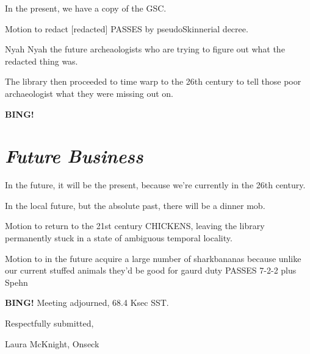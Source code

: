 \documentclass[10pt]{article}
\newcommand{\bing}{{\bf BING!} }
\newcommand{\goto}[1]{\bing \vskip 12pt \section*{{\em{#1}}}}
\newcommand{\ps}{ plus Spehn\xspace}
\newcommand{\onseck}{Laura McKnight, Onseck}
\begin{document}
In the present, we have a copy of the GSC.

Motion to redact [redacted] PASSES by pseudoSkinnerial decree.

Nyah Nyah the future archeaologists who are trying to figure out what the redacted thing was.

The library then proceeded to time warp to the 26th century to tell those poor archaeologist what they were missing out on.

\goto{Future Business}
In the future, it will be the present, because we're currently in the 26th century.

In the local future, but the absolute past, there will be a dinner mob.

Motion to return to the 21st century CHICKENS, leaving the library permanently stuck in a state of ambiguous temporal locality.

Motion to in the future acquire a large number of sharkbananas because unlike our current stuffed animals they'd be good for gaurd duty PASSES 7-2-2\ps

\bing
\noindent
Meeting adjourned, 68.4 Ksec SST.

\vspace{18pt}

\centerline{Respectfully submitted,}
\centerline{\onseck}
\end{document}
